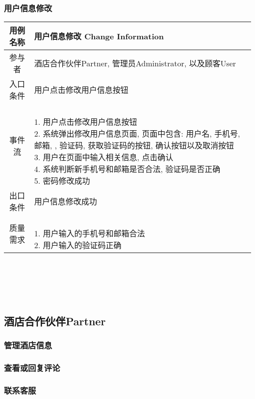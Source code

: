 \documentclass[11pt]{article}
\begin{document}
		\subsubsection{用户信息修改}
			\begin{tabular}{c|l}
			\hline
			用例名称 & 用户信息修改 Change Information \\ \hline
			参与者 & 酒店合作伙伴Partner, 管理员Administrator, 以及顾客User  \\ \hline
			入口条件 & 用户点击修改用户信息按钮 \\ \hline
			事件流 & 	\parbox{33em}{\ \\
						1. 用户点击修改用户信息按钮 \\
						2. 系统弹出修改用户信息页面, 页面中包含: 用户名, 手机号, 邮箱, , 验证码, 获取验证码的按钮, 确认按钮以及取消按钮\\
						3. 用户在页面中输入相关信息, 点击确认  \\
						4. 系统判断新手机号和邮箱是否合法, 验证码是否正确 \\
						5. 密码修改成功 \\
						} \\ \hline
			出口条件 & 用户信息修改成功 \\ \hline
			质量需求 & \parbox{33em}{\ \\
						1. 用户输入的手机号和邮箱合法 \\
						2. 用户输入的验证码正确 \\
						} \\ \hline
			\end{tabular}\\ \\ \\ \\ 

			
			
			
			
	\subsection{酒店合作伙伴Partner}
		\subsubsection{管理酒店信息}
		\subsubsection{查看或回复评论}
		\subsubsection{联系客服}
\end{document}
